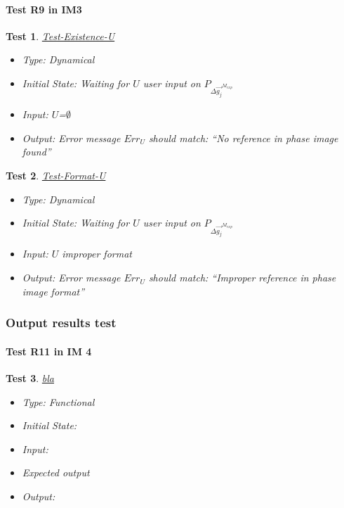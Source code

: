 \documentclass[12pt, titlepage]{article}
\newtheorem{Test}{Test}
\begin{document}
\paragraph{Test R9 in IM3}

\begin{Test}\normalfont\underline{Test-Existence-U}
\begin{itemize}
\item Type: Dynamical
\item Initial State: Waiting for $U$ user input on $P_{\Delta \overrightarrow{g_{j}}^{M_{exp}}}$
\item Input: $U$=$\emptyset$
\item Output:  Error message $Err_{U}$ should match: \enquote{No reference in phase image found}
\end{itemize}
\end{Test}

\begin{Test}\normalfont\underline{Test-Format-U}
\begin{itemize}
\item Type: Dynamical
\item Initial State: Waiting for $U$ user input on $P_{\Delta \overrightarrow{g_{j}}^{M_{exp}}}$
\item Input: $U$ improper format
\item Output:  Error message $Err_{U}$ should match: \enquote{Improper reference in phase image format}
\end{itemize}
\end{Test}

\subsubsection{Output results test}

\paragraph{Test R11 in IM 4}

\begin{Test}\normalfont\underline{bla}
\begin{itemize}
\item Type: Functional
\item Initial State:
\item Input: 
\item Expected output
\item Output:  
\end{itemize}
\end{Test}
\end{document}
